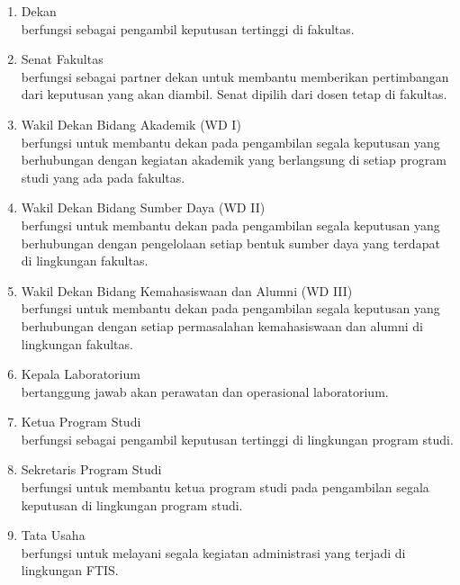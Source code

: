 \begin{enumerate}
	\item Dekan \\
	berfungsi sebagai pengambil keputusan tertinggi di fakultas.
	\item Senat Fakultas \\
	berfungsi sebagai partner dekan untuk membantu memberikan pertimbangan dari keputusan yang akan diambil. Senat dipilih dari dosen tetap di fakultas.
	\item Wakil Dekan Bidang Akademik (WD I)\\
	berfungsi untuk membantu dekan pada pengambilan segala keputusan yang berhubungan dengan kegiatan akademik yang berlangsung di setiap program studi yang ada pada fakultas.
	\item Wakil Dekan Bidang Sumber Daya (WD II)\\
	berfungsi untuk membantu dekan pada pengambilan segala keputusan yang berhubungan dengan pengelolaan setiap bentuk sumber daya yang terdapat di lingkungan fakultas.
	\item Wakil Dekan Bidang Kemahasiswaan dan Alumni (WD III)\\
	berfungsi untuk membantu dekan pada pengambilan segala keputusan yang berhubungan dengan setiap permasalahan kemahasiswaan dan alumni di lingkungan fakultas.
	\item Kepala Laboratorium \\
	bertanggung jawab akan perawatan dan operasional laboratorium.
	\item Ketua Program Studi \\
	berfungsi sebagai pengambil keputusan tertinggi di lingkungan program studi.
	\item Sekretaris Program Studi \\
	berfungsi untuk membantu ketua program studi pada pengambilan segala keputusan di lingkungan program studi.
	\item Tata Usaha \\
	berfungsi untuk melayani segala kegiatan administrasi yang terjadi di lingkungan FTIS.
\end{enumerate}

